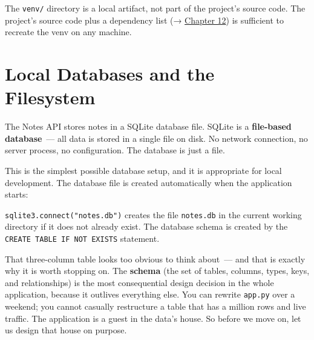 The \texttt{venv/} directory is a local artifact, not part of the project's source code. The project's source code plus a dependency list (→ \hyperref[ch:12-dependency-declaration]{Chapter 12}) is sufficient to recreate the venv on any machine.

\setcounter{section}{3}
\section{Local Databases and the Filesystem}\label{06-local-dependencies:64-local-databases-and-the-filesystem}

The Notes API stores notes in a SQLite database file. SQLite is a \textbf{file-based database}~--- all data is stored in a single file on disk. No network connection, no server process, no configuration. The database is just a file.

This is the simplest possible database setup, and it is appropriate for local development. The database file is created automatically when the application starts:

\begin{codebox}[short]

\begin{Shaded}
\begin{Highlighting}[]
\OperatorTok{=}\NormalTok{, }\NormalTok{)}

\OperatorTok{=}
\NormalTok{)}
\end{Highlighting}
\end{Shaded}

\end{codebox}

\noindent{}\texttt{sqlite3.}\allowbreak{}\texttt{connect("notes.}\allowbreak{}\texttt{db")} creates the file \texttt{notes.db} in the current working directory if it does not already exist. The database schema is created by the \texttt{CREATE\ TABLE\ IF\ NOT\ EXISTS} statement.

That three-column table looks too obvious to think about~--- and that is exactly why it is worth stopping on. The \textbf{schema} (the set of tables, columns, types, keys, and relationships) is the most consequential design decision in the whole application, because it outlives everything else. You can rewrite \texttt{app.py} over a weekend; you cannot casually restructure a table that has a million rows and live traffic. The application is a guest in the data's house. So before we move on, let us design that house on purpose.

